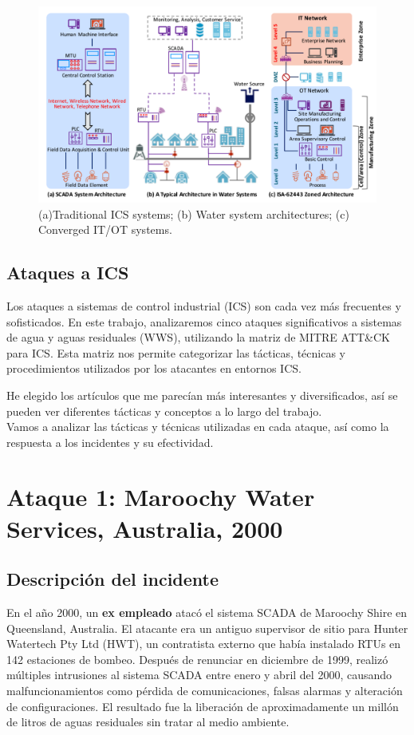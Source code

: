 \begin{figure}[htbp]
    \centering
    \includegraphics[width=\columnwidth]{images/ICSarchitecture.png}
    \caption{(a)Traditional \textsc{ICS} systems; (b) Water system architectures; (c) Converged \textsc{IT/OT} systems.}
    \label{fig:ICSarchitecture}
\end{figure}

\subsection{Ataques a ICS}
Los ataques a sistemas de control industrial (ICS) son cada vez más frecuentes y sofisticados. En este trabajo, analizaremos cinco ataques significativos a sistemas de agua y aguas residuales (\textsc{WWS}), utilizando la matriz de MITRE ATT\&CK para ICS. Esta matriz nos permite categorizar las tácticas, técnicas y procedimientos utilizados por los atacantes en entornos ICS.

He elegido los artículos que me parecían más interesantes y diversificados, así se pueden ver diferentes tácticas y conceptos a lo largo del trabajo.\\
Vamos a analizar las tácticas y técnicas utilizadas en cada ataque, así como la respuesta a los incidentes y su efectividad.
\newpage
\section{Ataque 1: Maroochy Water Services, Australia, 2000}

\subsection{Descripción del incidente}
En el año 2000, un \textbf{ex empleado} atacó el sistema \textsc{SCADA} de Maroochy Shire en Queensland, Australia. El atacante era un antiguo supervisor de sitio para Hunter Watertech Pty Ltd (HWT), un contratista externo que había instalado \textsc{RTU}s en 142 estaciones de bombeo. Después de renunciar en diciembre de 1999, realizó múltiples intrusiones al sistema \textsc{SCADA} entre enero y abril del 2000, causando malfuncionamientos como pérdida de comunicaciones, falsas alarmas y alteración de configuraciones. El resultado fue la liberación de aproximadamente un millón de litros de aguas residuales sin tratar al medio ambiente.
\nl

